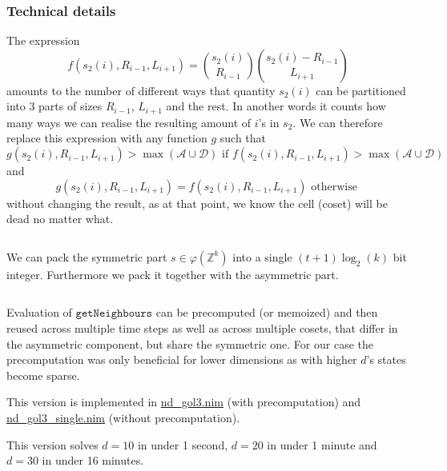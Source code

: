 \documentclass[]{article}
\newcommand{\ZZ}{\mathbb Z}
\newcommand{\calA}{\mathcal A}
\newcommand{\calD}{\mathcal D}
\begin{document}
	\subsubsection{Technical details}
	The expression
	$$f(s_2(i), R_{i-1}, L_{i+1}) = \binom{s_2(i)}{R_{i-1}}\binom{s_2(i) - R_{i-1}}{L_{i+1}}$$
	amounts to the number of different ways that quantity $s_2(i)$ can be partitioned into 3 parts of sizes $R_{i-1}$, $L_{i+1}$ and the rest. In another words it counts how many ways we can realise the resulting amount of $i$'s in $s_2$. We can therefore replace this expression with any function $g$ such that	
	$$g(s_2(i), R_{i-1}, L_{i+1}) > \max(\calA\cup\calD) \text{ if } f(s_2(i), R_{i-1}, L_{i+1}) > \max(\calA\cup\calD)$$
	and
	$$g(s_2(i), R_{i-1}, L_{i+1}) = f(s_2(i), R_{i-1}, L_{i+1}) \text{ otherwise }$$
	without changing the result, as at that point, we know the cell (coset) will be dead no matter what.
	
	$ $
	
	We can pack the symmetric part $s \in \varphi(\ZZ^k)$ into a single $(t+1)\log_2(k)$ bit integer. Furthermore we pack it together with the asymmetric part.
	
	$ $
	
	Evaluation of $\texttt{getNeighbours}$ can be precomputed (or memoized) and then reused across multiple time steps as well as across multiple cosets, that differ in the asymmetric component, but share the symmetric one. For our case the precomputation was only beneficial for lower dimensions as with higher $d$'s states become sparse.
	
	This version is implemented in \href{https://github.com/MichalMarsalek/Advent-of-code/blob/master/2020/misc/day17-highdims/nd_gol3.nim}{nd\_gol3.nim} 
	(with precomputation) and \href{https://github.com/MichalMarsalek/Advent-of-code/blob/master/2020/misc/day17-highdims/nd_gol3\_single.nim}{nd\_gol3\_single.nim} (without precomputation).
	
	This version solves $d=10$ in under 1 second, $d=20$ in under 1 minute and $d=30$ in under 16 minutes.
	
	
\end{document}
